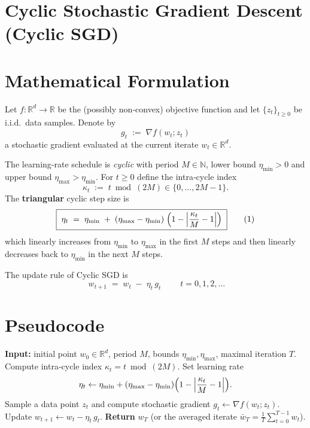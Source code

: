 \documentclass{article}
\begin{document}
\section*{Cyclic Stochastic Gradient Descent (Cyclic SGD)}

\section*{Mathematical Formulation}
Let $f:\mathbb{R}^{d}\to\mathbb{R}$ be the (possibly non‑convex) objective function and let
$\{z_{t}\}_{t\ge 0}$ be i.i.d.\ data samples.  
Denote by 
\[
g_{t}\;:=\;\nabla f(w_{t};z_{t})
\]
a stochastic gradient evaluated at the current iterate $w_{t}\in\mathbb{R}^{d}$.

The learning‑rate schedule is \emph{cyclic} with period $M\in\mathbb{N}$, lower bound
$\eta_{\min}>0$ and upper bound $\eta_{\max}> \eta_{\min}$.  
For $t\ge 0$ define the intra‑cycle index 
\[
\kappa_{t}\;:=\;t\bmod (2M)\in\{0,\dots ,2M-1\}.
\]
The \textbf{triangular} cyclic step size is
\[
\boxed{\;
\eta_{t}\;=\;\eta_{\min}
      \;+\;(\eta_{\max}-\eta_{\min})\;
        \Bigl(1-\Bigl|\frac{\kappa_{t}}{M}-1\Bigr|\Bigr)
\;}
\tag{1}
\]
which linearly increases from $\eta_{\min}$ to $\eta_{\max}$ in the first $M$ steps
and then linearly decreases back to $\eta_{\min}$ in the next $M$ steps.

The update rule of Cyclic SGD is
\[
\boxed{\; w_{t+1}\;=\;w_{t}\;-\;\eta_{t}\,g_{t}\; } \qquad t=0,1,2,\dots
\tag{2}
\]

\section*{Pseudocode}
\begin{algorithm}[H]
\caption{Cyclic Stochastic Gradient Descent}
\begin{algorithmic}[1]
\State \textbf{Input:} initial point $w_{0}\in\mathbb{R}^{d}$,
period $M$, bounds $\eta_{\min},\eta_{\max}$,
maximal iteration $T$.
    \State Compute intra‑cycle index $\kappa_{t}=t\bmod (2M)$.
    \State Set learning rate 
    \[
    \eta_{t}\gets \eta_{\min}+(\eta_{\max}-\eta_{\min})\Bigl(1-\Bigl|\frac{\kappa_{t}}{M}-1\Bigr|\Bigr).
    \] 
    \State Sample a data point $z_{t}$ and compute stochastic gradient 
    $g_{t}\gets\nabla f(w_{t};z_{t})$.
    \State Update $w_{t+1}\gets w_{t}-\eta_{t}\,g_{t}$. 
\EndFor
\State \textbf{Return} $w_{T}$ (or the averaged iterate $\bar w_{T}=\frac1T\sum_{t=0}^{T-1}w_{t}$).
\end{algorithmic}
\end{algorithm}
\end{document}
